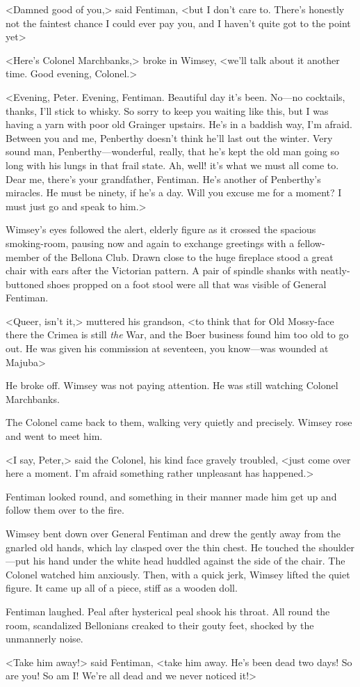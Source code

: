 <Damned good of you,> said Fentiman, <but I don't care to. There's honestly not the faintest chance I could ever pay you, and I haven't quite got to the point yet\longdash>

<Here's Colonel Marchbanks,> broke in Wimsey, <we'll talk about it another time. Good evening, Colonel.>

<Evening, Peter. Evening, Fentiman. Beautiful day it's been. No—no cocktails, thanks, I'll stick to whisky. So sorry to keep you waiting like this, but I was having a yarn with poor old Grainger upstairs. He's in a baddish way, I'm afraid. Between you and me, Penberthy doesn't think he'll last out the winter. Very sound man, Penberthy—wonderful, really, that he's kept the old man going so long with his lungs in that frail state. Ah, well! it's what we must all come to. Dear me, there's your grandfather, Fentiman. He's another of Penberthy's miracles. He must be ninety, if he's a day. Will you excuse me for a moment? I must just go and speak to him.>

Wimsey's eyes followed the alert, elderly figure as it crossed the spacious smoking-room, pausing now and again to exchange greetings with a fellow-member of the Bellona Club. Drawn close to the huge fireplace stood a great chair with ears after the Victorian pattern. A pair of spindle shanks with neatly-buttoned shoes propped on a foot stool were all that was visible of General Fentiman.

<Queer, isn't it,> muttered his grandson, <to think that for Old Mossy-face there the Crimea is still \emph{the} War, and the Boer business found him too old to go out. He was given his commission at seventeen, you know—was wounded at Majuba\longdash>

He broke off. Wimsey was not paying attention. He was still watching Colonel Marchbanks.

The Colonel came back to them, walking very quietly and precisely. Wimsey rose and went to meet him.

<I say, Peter,> said the Colonel, his kind face gravely troubled, <just come over here a moment. I'm afraid something rather unpleasant has happened.>

Fentiman looked round, and something in their manner made him get up and follow them over to the fire.

Wimsey bent down over General Fentiman and drew the  gently away from the gnarled old hands, which lay clasped over the thin chest. He touched the shoulder—put his hand under the white head huddled against the side of the chair. The Colonel watched him anxiously. Then, with a quick jerk, Wimsey lifted the quiet figure. It came up all of a piece, stiff as a wooden doll.

Fentiman laughed. Peal after hysterical peal shook his throat. All round the room, scandalized Bellonians creaked to their gouty feet, shocked by the unmannerly noise.

<Take him away!> said Fentiman, <take him away. He's been dead two days! So are you! So am I\@! We're all dead and we never noticed it!>